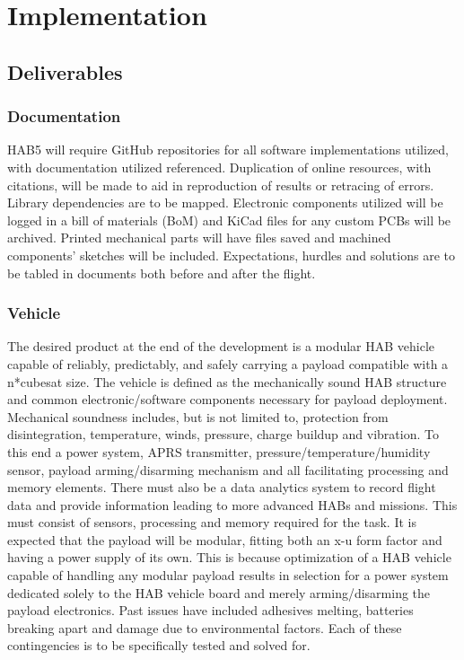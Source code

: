 \documentclass[conference]{IEEEtran} %
\begin{document}
\section{Implementation}
\label{implementation}
\subsection{Deliverables}
\label{deliverables}
\subsubsection{Documentation}
\label{deliverables-documentation}
 HAB5 will require GitHub repositories for all software implementations utilized, with documentation utilized referenced. Duplication of online resources, with citations, will be made to aid in reproduction of results or retracing of errors. 
 Library dependencies are to be mapped. 
 Electronic components utilized will be logged in a bill of materials (BoM) and KiCad files for any custom PCBs will be archived. 
 Printed mechanical parts will have files saved and machined components' sketches will be included. 
 Expectations, hurdles and solutions are to be tabled in documents both before and after the flight.

\subsubsection{Vehicle}
\label{deliverables-vehicle}
The desired product at the end of the development is a modular HAB vehicle capable of reliably, predictably, and safely carrying a payload compatible with a n*cubesat size. 
The vehicle is defined as the mechanically sound HAB structure and common electronic/software components necessary for payload deployment. 
Mechanical soundness includes, but is not limited to, protection from disintegration, temperature, winds, pressure, charge buildup and vibration. 
To this end a power system, APRS transmitter, pressure/temperature/humidity sensor, payload arming/disarming mechanism and all facilitating processing and memory elements. 
There must also be a data analytics system to record flight data and provide information leading to more advanced HABs and missions. 
This must consist of sensors, processing and memory required for the task.
It is expected that the payload will be modular, fitting both an x-u form factor and having a power supply of its own. 
This is because optimization of a HAB vehicle capable of handling any modular payload results in selection for a power system dedicated solely to the HAB vehicle board and merely arming/disarming the payload electronics. 
Past issues have included adhesives melting, batteries breaking apart and damage due to environmental factors. Each of these contingencies is to be specifically tested and solved for.
\end{document}

